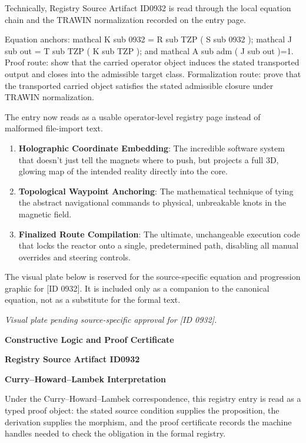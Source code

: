 Technically, Registry Source Artifact ID0932 is read through the local equation chain and the TRAWIN normalization recorded on the entry page.

Equation anchors: mathcal K sub 0932 = R sub TZP ( S sub 0932 ); mathcal J sub out = T sub TZP ( K sub TZP ); and mathcal A sub adm ( J sub out )=1. Proof route: show that the carried operator object induces the stated transported output and closes into the admissible target class. Formalization route: prove that the transported carried object satisfies the stated admissible closure under TRAWIN normalization.

The entry now reads as a usable operator-level registry page instead of malformed file-import text.
\endgroup

\begin{enumerate}[leftmargin=1.6em,itemsep=6pt,topsep=4pt]
\item \textbf{Holographic Coordinate Embedding}: The incredible software system that doesn't just tell the magnets where to push, but projects a full 3D, glowing map of the intended reality directly into the core.
\item \textbf{Topological Waypoint Anchoring}: The mathematical technique of tying the abstract navigational commands to physical, unbreakable knots in the magnetic field.
\item \textbf{Finalized Route Compilation}: The ultimate, unchangeable execution code that locks the reactor onto a single, predetermined path, disabling all manual overrides and steering controls.
\end{enumerate}

\begingroup\footnotesize\sloppy
The visual plate below is reserved for the source-specific equation and progression graphic for [ID 0932]. It is included only as a companion to the canonical equation, not as a substitute for the formal text.
\par\endgroup
\begingroup\footnotesize\itshape
Visual plate pending source-specific approval for [ID 0932].
\par\endgroup

\clearpage
\begingroup\tzpsupportsetup
\noindent\textbf{\fontsize{10.8pt}{12.8pt}\selectfont [ID 0932] Constructive Logic and Proof Certificate}\par
\noindent\textbf{\fontsize{10pt}{12pt}\selectfont Registry Source Artifact ID0932}\par
\vspace{0.45em}
\begingroup
\footnotesize
\setlength{\parskip}{0.22em}
\setlength{\parindent}{0pt}
\noindent\textbf{Curry--Howard--Lambek Interpretation}\par
Under the Curry--Howard--Lambek correspondence, this registry entry is read as a typed proof
object: the stated source condition supplies the proposition, the derivation supplies the
morphism, and the proof certificate records the machine handles needed to check the obligation
in the formal registry.

